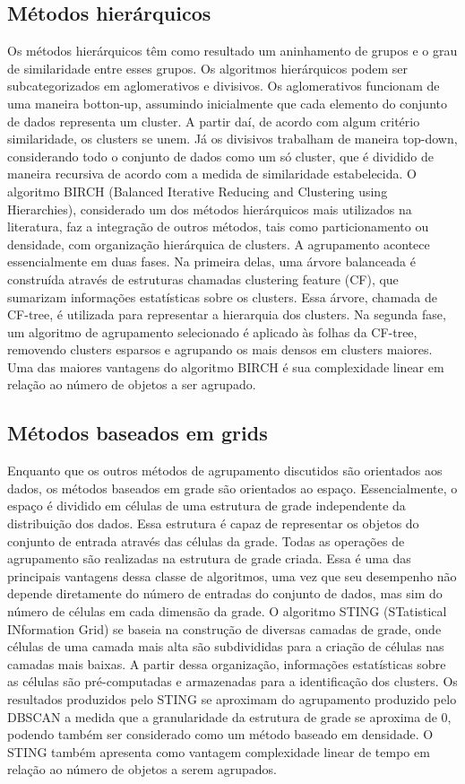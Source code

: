 \subsection{Métodos hierárquicos}
Os métodos hierárquicos têm como resultado um aninhamento de grupos e o grau de
similaridade entre esses grupos. Os algoritmos hierárquicos podem ser subcategorizados
em aglomerativos e divisivos. Os aglomerativos funcionam de uma maneira botton-up,
assumindo inicialmente que cada elemento do conjunto de dados representa um cluster. A
partir daí, de acordo com algum critério similaridade, os clusters se unem. Já os divisivos
trabalham de maneira top-down, considerando todo o conjunto de dados como um só
cluster, que é dividido de maneira recursiva de acordo com a medida de similaridade
estabelecida.
O algoritmo BIRCH (Balanced Iterative Reducing and Clustering using Hierarchies),
considerado um dos métodos hierárquicos mais utilizados na literatura, faz a integração
de outros métodos, tais como particionamento ou densidade, com organização hierárquica
de clusters. A agrupamento acontece essencialmente em duas fases. Na primeira delas,
uma árvore balanceada é construída através de estruturas chamadas clustering feature
(CF), que sumarizam informações estatísticas sobre os clusters. Essa árvore, chamada de
CF-tree, é utilizada para representar a hierarquia dos clusters. Na segunda fase, um algoritmo
de agrupamento selecionado é aplicado às folhas da CF-tree, removendo clusters
esparsos e agrupando os mais densos em clusters maiores. Uma das maiores vantagens
do algoritmo BIRCH é sua complexidade linear em relação ao número de objetos a ser
agrupado.

\subsection{Métodos baseados em grids}
Enquanto que os outros métodos de agrupamento discutidos são orientados aos dados,
os métodos baseados em grade são orientados ao espaço. Essencialmente, o espaço
é dividido em células de uma estrutura de grade independente da distribuição dos dados.
Essa estrutura é capaz de representar os objetos do conjunto de entrada através das células
da grade. Todas as operações de agrupamento são realizadas na estrutura de grade
criada. Essa é uma das principais vantagens dessa classe de algoritmos, uma vez que seu
desempenho não depende diretamente do número de entradas do conjunto de dados, mas
sim do número de células em cada dimensão da grade.
O algoritmo STING (STatistical INformation Grid) se baseia na construção de diversas
camadas de grade, onde células de uma camada mais alta são subdivididas para a criação
de células nas camadas mais baixas. A partir dessa organização, informações estatísticas
sobre as células são pré-computadas e armazenadas para a identificação dos clusters.
Os resultados produzidos pelo STING se aproximam do agrupamento produzido pelo
DBSCAN a medida que a granularidade da estrutura de grade se aproxima de 0, podendo
também ser considerado como um método baseado em densidade. O STING também
apresenta como vantagem complexidade linear de tempo em relação ao número de objetos
a serem agrupados.

